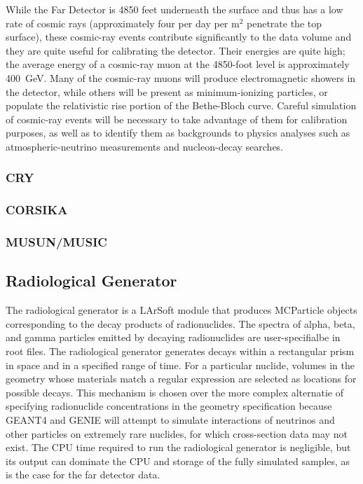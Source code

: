 While the Far Detector is 4850 feet underneath the surface and thus has a low rate of cosmic rays (approximately 
four per day per m$^2$ penetrate the top surface), these cosmic-ray events contribute significantly to the data
volume and they are quite useful for calibrating the detector.  Their energies are quite high; the average energy
of a cosmic-ray muon at the 4850-foot level is approximately 400~GeV.  Many of the cosmic-ray muons will produce
electromagnetic showers in the detector, while others will be present as minimum-ionizing particles, or populate
the relativistic rise portion of the Bethe-Bloch curve.  Careful simulation of cosmic-ray events will be necessary
to take advantage of them for calibration purposes, as well as to identify them as backgrounds to physics analyses
such as atmospheric-neutrino measurements and nucleon-decay searches.

\subsubsection{CRY}

\subsubsection{CORSIKA}

\subsubsection{MUSUN/MUSIC}  %

\subsection{Radiological Generator}

The radiological generator is a LArSoft module that produces MCParticle objects corresponding
to the decay products of radionuclides.  The spectra of alpha, beta, and gamma particles emitted
by decaying radionuclides are user-specifialbe in root files.  The radiological generator generates
decays within a rectangular prism in space and in a specified range of time.  For a particular
nuclide, volumes in the geometry whose materials match a regular expression are selected as locations
for possible decays.  This mechanism is chosen over the more complex alternatie of specifying radionuclide
concentrations in the geometry specification because GEANT4 and GENIE will attempt to simulate interactions
of neutrinos and other particles on extremely rare nuclides, for which cross-section data may not exist.
The CPU time required to run the radiological generator is negligible, but its output can dominate
the CPU and storage of the fully simulated samples, as is the case for the far detector data.

